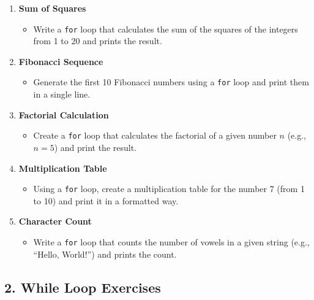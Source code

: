 \documentclass[10pt]{book}
\begin{document}
\begin{enumerate}
    \item \textbf{Sum of Squares}
    \begin{itemize}
        \item Write a \texttt{for} loop that calculates the sum of the squares of the integers from 1 to 20 and prints the result.
    \end{itemize}

    \item \textbf{Fibonacci Sequence}
    \begin{itemize}
        \item Generate the first 10 Fibonacci numbers using a \texttt{for} loop and print them in a single line.
    \end{itemize}

    \item \textbf{Factorial Calculation}
    \begin{itemize}
        \item Create a \texttt{for} loop that calculates the factorial of a given number \( n \) (e.g., \( n = 5 \)) and print the result.
    \end{itemize}

    \item \textbf{Multiplication Table}
    \begin{itemize}
        \item Using a \texttt{for} loop, create a multiplication table for the number 7 (from 1 to 10) and print it in a formatted way.
    \end{itemize}

    \item \textbf{Character Count}
    \begin{itemize}
        \item Write a \texttt{for} loop that counts the number of vowels in a given string (e.g., ``Hello, World!'') and prints the count.
    \end{itemize}
\end{enumerate}

\subsection*{2. While Loop Exercises}
\end{document}

